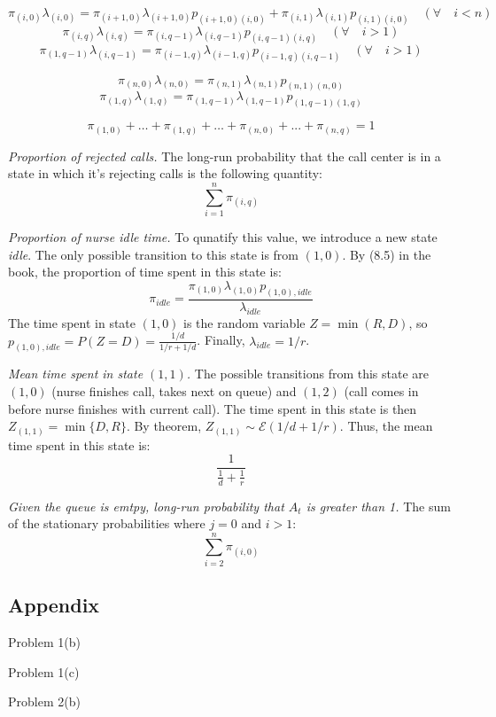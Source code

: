 \documentclass[12pt]{article}
\begin{document}
$$ \pi_{(i,0)}\lambda_{(i,0)} = \pi_{(i+1,0)}\lambda_{(i+1,0)}p_{(i+1,0)(i,0)} + 
                                \pi_{(i,1)}\lambda_{(i,1)}p_{(i,1)(i,0)}
  \quad (\forall \quad i < n)$$
$$ \pi_{(i,q)}\lambda_{(i,q)} = \pi_{(i,q-1)}\lambda_{(i,q-1)}p_{(i,q-1)(i,q)}
  \quad (\forall \quad i > 1)$$
$$ \pi_{(1,q-1)}\lambda_{(i,q-1)} = \pi_{(i-1,q)}\lambda_{(i-1,q)}p_{(i-1,q)(i,q-1)} 
  \quad (\forall \quad i > 1)$$

$$ \pi_{(n,0)}\lambda_{(n,0)} = \pi_{(n,1)}\lambda_{(n,1)}p_{(n,1)(n,0)} $$ 
$$ \pi_{(1,q)}\lambda_{(1,q)} = \pi_{(1,q-1)}\lambda_{(1,q-1)}p_{(1,q-1)(1,q)} $$

$$ \pi_{(1,0)} + \dots + \pi_{(1,q)} + \dots + \pi_{(n,0)} + ... + \pi_{(n,q)} = 1 $$

\textit{Proportion of rejected calls.} The long-run probability that the call center
is in a state in which it's rejecting calls is the following quantity: 
$$ \sum_{i=1}^n{\pi_{(i,q)}}$$

\textit{Proportion of nurse idle time.} To qunatify this value, we introduce a new 
state \textit{idle}. The only possible transition to this state is from $(1,0)$. 
By (8.5) in the book, the proportion of time spent in this state is: 
$$ \pi_{idle} = \frac{\pi_{(1,0)}\lambda_{(1,0)}p_{(1,0),idle}}{\lambda_{idle}} $$
The time spent in state $(1,0)$ is the random variable $Z = \min{(R, D)}$, so 
$p_{(1,0),idle} = P(Z=D) = \frac{1/d}{1/r + 1/d}$. Finally, $\lambda_{idle} = {1/r}$. 

\textit{Mean time spent in state $(1,1)$.} The possible transitions from this state are 
$(1,0)$ (nurse finishes call, takes next on queue) and $(1,2)$ (call comes in 
before nurse finishes with current call). The time spent in this state is then 
$Z_{(1,1)} = \min \{ D, R \}$. By theorem, $Z_{(1,1)} \sim \mathcal{E}(1/d + 1/r)$. Thus,
the mean time spent in this state is: $$ \frac{1}{\frac{1}{d} + \frac{1}{r}} $$ 

\textit{Given the queue is emtpy, long-run probability that $A_t$ is greater than 1.} 
The sum of the stationary probabilities where $j=0$ and $i>1$: 
$$ \sum_{i=2}^n{\pi_{(i,0)}} $$

\subsection*{Appendix}


\lstset{
  basicstyle=\small,
  stringstyle=\ttfamily,
  numbers=left,
  numberstyle=\tiny,
  stepnumber=1, 
  numbersep=5pt,
  language=R }

{Problem 1(b)}


{Problem 1(c)}


{Problem 2(b)}

\end{document}
